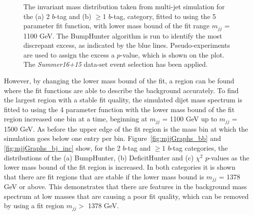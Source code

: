 \begin{figure}[!ht]
  \begin{center}
    \captionsetup[subfigure]{aboveskip=0pt,justification=centering}
  \end{center}
  \caption{ The invariant mass distribution taken from multi-jet simulation for the (a) 2 $b$-tag and (b) $\geq$1 $b$-tag,
    category, fitted to using the 5 parameter fit function, with lower mass bound of the fit range $m_{jj}$ = 1100 GeV.
    The BumpHunter algorithm is run to identify the most discrepant excess, as indicated by the blue lines.
    Pseudo-experiments are used to assign the excess a $p$-value, which is shown on the plot.
    The \textit{Summer16+15} data-set event selection has been applied.}
  \label{fig:Short_5para_1100_figure1}
\end{figure}

\FloatBarrier

However, by changing the lower mass bound of the fit,
a region can be found where the fit functions are able to describe the background accurately.
To find the largest region with a stable fit quality, the simulated dijet mass spectrum is
fitted to using the 4 parameter function with the lower mass bound of the fit region increased one bin at a time,
beginning at $m_{jj}$ = 1100 GeV up to $m_{jj}$ = 1500 GeV.
As before the upper edge of the fit region is the mass bin at which the simulation goes below one entry per bin.
Figure~\ref{fig:mjjGraphs_bb} and \ref{fig:mjjGraphs_bj_inc} show,
for the 2 $b$-tag and $\geq1$ $b$-tag categories, the distributions of the
(a) BumpHunter, (b) DeficitHunter and (c) $\chi^{2}$ $p$-values as the lower mass bound of the fit region is increased.
In both categories it is shown that there are fit regions that are stable if the lower mass bound is $m_{jj}$ = 1378 GeV or above.
This demonstrates that there are features in the background mass spectrum at low masses that are causing a poor fit quality,
which can be removed by using a fit region $m_{jj} >$ 1378 GeV. 

